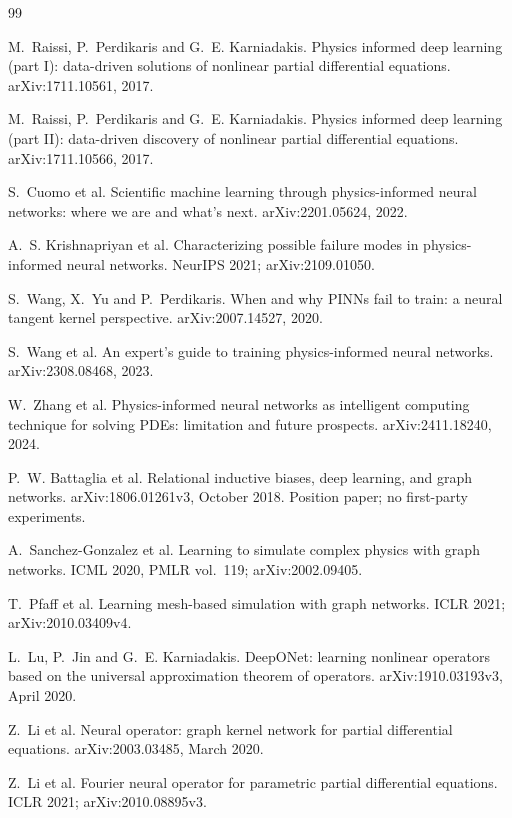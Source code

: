 \documentclass[11pt, a4paper]{article}
\begin{document}
\clearpage
\begin{thebibliography}{99}
\small

 M.~Raissi, P.~Perdikaris and G.~E. Karniadakis. Physics
informed deep learning (part I): data-driven solutions of nonlinear partial
differential equations. arXiv:1711.10561, 2017.

 M.~Raissi, P.~Perdikaris and G.~E. Karniadakis. Physics
informed deep learning (part II): data-driven discovery of nonlinear
partial differential equations. arXiv:1711.10566, 2017.

 S.~Cuomo et al. Scientific machine learning through
physics-informed neural networks: where we are and what's next.
arXiv:2201.05624, 2022.

 A.~S. Krishnapriyan et al. Characterizing possible
failure modes in physics-informed neural networks. NeurIPS 2021; arXiv:2109.01050.

 S.~Wang, X.~Yu and P.~Perdikaris. When and why PINNs
fail to train: a neural tangent kernel perspective. arXiv:2007.14527, 2020.

 S.~Wang et al. An expert's guide to training
physics-informed neural networks. arXiv:2308.08468, 2023.

 W.~Zhang et al. Physics-informed neural networks as
intelligent computing technique for solving PDEs: limitation and future
prospects. arXiv:2411.18240, 2024.

 P.~W. Battaglia et al. Relational inductive biases,
deep learning, and graph networks. arXiv:1806.01261v3, October 2018. Position paper; no first-party experiments.

 A.~Sanchez-Gonzalez et al. Learning to simulate
complex physics with graph networks. ICML 2020, PMLR vol.~119; arXiv:2002.09405.

 T.~Pfaff et al. Learning mesh-based simulation with
graph networks. ICLR 2021; arXiv:2010.03409v4.

 L.~Lu, P.~Jin and G.~E. Karniadakis. DeepONet: learning
nonlinear operators based on the universal approximation theorem of
operators. arXiv:1910.03193v3, April 2020.

 Z.~Li et al. Neural operator: graph kernel network for
partial differential equations. arXiv:2003.03485, March 2020.

 Z.~Li et al. Fourier neural operator for parametric partial
differential equations. ICLR 2021; arXiv:2010.08895v3.


\end{thebibliography}
\end{document}
